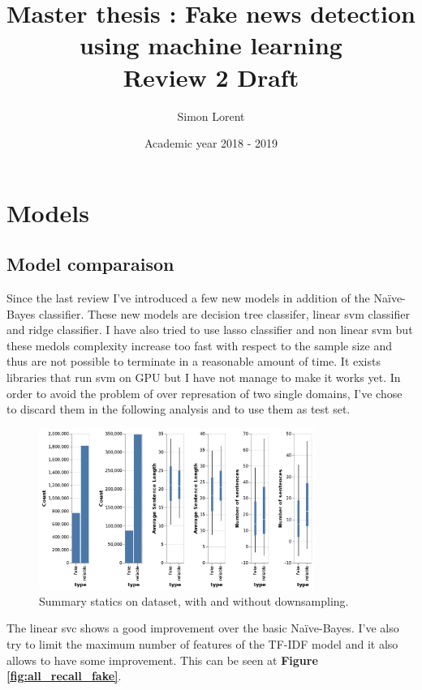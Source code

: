 \documentclass[11pt,a4paper,oneside]{report}
\title{\textbf{Master thesis : Fake news detection using machine learning}
\\ Review 2 Draft}
\author{Simon Lorent}
\date{Academic year 2018 - 2019}
\begin{document}
\maketitle

\section{Models}
\subsection{Model comparaison} \label{section:model_comp}

Since the last review I've introduced a few new models in addition of the Naïve-Bayes classifier. These new models are decision tree classifer, linear svm classifier and ridge classifier. I have also tried to use lasso classifier and non linear svm but these medols complexity increase too fast with respect to the sample size and thus are not possible to terminate in a reasonable amount of time. It exists libraries that run svm on GPU but I have not manage to make it works yet. In order to avoid the problem of over represation of two single domains, I've chose to discard them in the following analysis and to use them as test set. 

\begin{figure}[h]
	\centering
        \includegraphics[width=0.8\textwidth]{output/numSentences.png}
        \caption{Summary statics on dataset, with and without downsampling.}
        \label{fig:numSentences}
\end{figure}
The linear svc shows a good improvement over the basic Naïve-Bayes. I've also try to limit the maximum number of features of the TF-IDF model and it also allows to have some improvement. This can be seen at \textbf{Figure \ref{fig:all_recall_fake}}.
\end{document}
